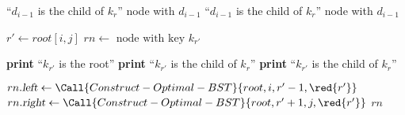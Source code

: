 
\begin{algorithm}[H]
  \begin{algorithmic}[1]
    	
	 ``$d_{i-1}$ is the  child of $k_{r}$'' \quad \Return node with $d_{i-1}$
      \EndIf
	 ``$d_{i-1}$ is the  child of $k_{r}$'' \quad \Return node with $d_{i-1}$
      \EndIf

      \hStatex
      \State $r' \gets root[i,j]$ \qquad $rn \gets \text{ node with key } k_{r'}$

      \hStatex
	\State \textbf{print} ``$k_{r'}$ is the root''
        \State \textbf{print} ``$k_{r'}$ is the  child of $k_{r}$''
        \State \textbf{print} ``$k_{r'}$ is the  child of $k_{r}$''
      \EndIf

      \hStatex
      \State $rn.\textsl{left} \gets \Call{Construct-Optimal-BST}{root, i, r'-1, \red{r'}}$
      \State $rn.\textsl{right} \gets \Call{Construct-Optimal-BST}{root, r'+1, j, \red{r'}}$
      \State \Return $rn$
    \EndProcedure
  \end{algorithmic}
\end{algorithm}
